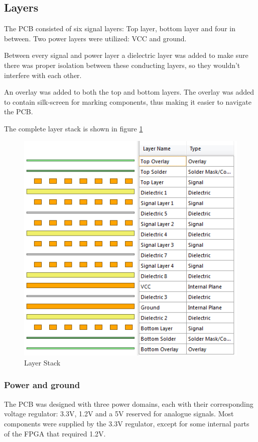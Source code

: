 \subsection{Layers}
The PCB consisted of six signal layers: Top layer, bottom layer and four in between.
Two power layers were utilized: VCC and ground.

Between every signal and power layer a dielectric layer was added to make sure there was proper isolation between these conducting layers, so they wouldn't interfere with each other.

An overlay was added to both the top and bottom layers.
The overlay was added to contain silk-screen for marking components, thus making it easier to navigate the PCB.

The complete layer stack is shown in figure \ref{fig:Layers}

\begin{figure}[h!]
\centering
\includegraphics[scale = 0.8]{images/Layers.png}
\caption{Layer Stack}
\label{fig:Layers}
\end{figure}

\subsubsection{Power and ground}
\label{Power}
The PCB was designed with three power domains, each with their corresponding voltage regulator: 3.3V, 1.2V and a 5V reserved for analogue signals.
Most components were supplied by the 3.3V regulator, except for some internal parts of the FPGA that required 1.2V.

